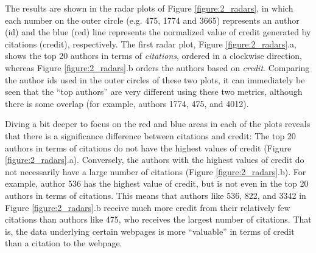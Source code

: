 The results are shown in the radar plots of Figure \ref{figure:2_radars}, in which each number on the outer circle (e.g. 475, 1774 and 3665) represents an author (id) and the blue (red) line represents the normalized value of credit generated by citations (credit), respectively. The first radar plot,
Figure \ref{figure:2_radars}.a, shows the top 20 authors in terms of {\em citations}, ordered in a clockwise direction, whereas Figure \ref{figure:2_radars}.b orders the authors based on {\em credit}. 
Comparing the author ids used in the outer circles of these two plots, it can immediately be seen that the ``top authors'' are very different using these two metrics, although there is some overlap (for example, authors 1774, 475, and 4012). 

Diving a bit deeper to focus on the red and blue areas in each of the plots reveals that there is a significance difference between citations and credit:
The top 20 authors in terms of citations do not have the highest values of credit (Figure \ref{figure:2_radars}.a).  Conversely, the authors with the highest values of credit do not necessarily have a large number of citations (Figure \ref{figure:2_radars}.b).
For example, author 536 has the highest value of credit, but is not even in the top 20 authors in terms of citations. This means that authors like 536, 822, and 3342 in Figure \ref{figure:2_radars}.b receive much more credit from their relatively few citations than authors like 475, who receives the largest number of citations.
That is, the data underlying certain webpages is more ``valuable'' in terms of credit than a citation to the webpage.  


